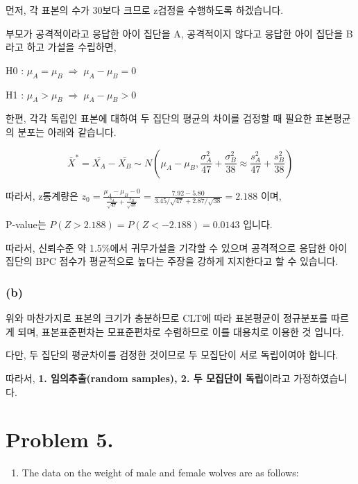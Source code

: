 \documentclass[
  a4paper,
  DIV=11,
  numbers=noendperiod]{scrreprt}
\providecommand{\tightlist}{%
  \setlength{\itemsep}{0pt}\setlength{\parskip}{0pt}}\usepackage{longtable,booktabs,array}
\begin{document}
먼저, 각 표본의 수가 30보다 크므로 z검정을 수행하도록 하겠습니다.

부모가 공격적이라고 응답한 아이 집단을 A, 공격적이지 않다고 응답한 아이
집단을 B라고 하고 가설을 수립하면,

H0 : \(\mu_A=\mu_B\;\Rightarrow\;\mu_A-\mu_B=0\)

H1 : \(\mu_A>\mu_B\;\Rightarrow\;\mu_A-\mu_B>0\)

한편, 각각 독립인 표본에 대하여 두 집단의 평균의 차이를 검정할 때 필요한
표본평균의 분포는 아래와 같습니다.

\[\bar{X}^*=\bar{X_A}-\bar{X_B}\sim N(\mu_A-\mu_B,\frac{\sigma_A^2}{47}+\frac{\sigma_B^2}{38}\approx\frac{s_A^2}{47}+\frac{s_B^2}{38})\]

따라서, z통계량은
\(z_0=\frac{\mu_A-\mu_B-0}{\frac{s_A}{\sqrt{47}}+\frac{s_B}{\sqrt{38}}}=\frac{7.92-5.80}{3.45/\sqrt{47}+2.87/\sqrt{38}}=2.188\)
이며,

P-value는 \(P(Z>2.188)=P(Z<-2.188)=0.0143\) 입니다.

따라서, 신뢰수준 약 1.5\%에서 귀무가설을 기각할 수 있으며 공격적으로
응답한 아이 집단의 BPC 점수가 평균적으로 높다는 주장을 강하게 지지한다고
할 수 있습니다.

\subsubsection*{(b)}\label{b-3}

위와 마찬가지로 표본의 크기가 충분하므로 CLT에 따라 표본평균이
정규분포를 따르게 되며, 표본표준편차는 모표준편차로 수렴하므로 이를
대용치로 이용한 것 입니다.

다만, 두 집단의 평균차이를 검정한 것이므로 두 모집단이 서로 독립이여야
합니다.

따라서, \textbf{1. 임의추출(random samples), 2. 두 모집단이 독립}이라고
가정하였습니다.

\section*{Problem 5.}\label{problem-5.}


\begin{enumerate}
\def\labelenumi{\arabic{enumi}.}
\setcounter{enumi}{4}
\tightlist
\item
  The data on the weight of male and female wolves are as follows:
\end{enumerate}
\end{document}
